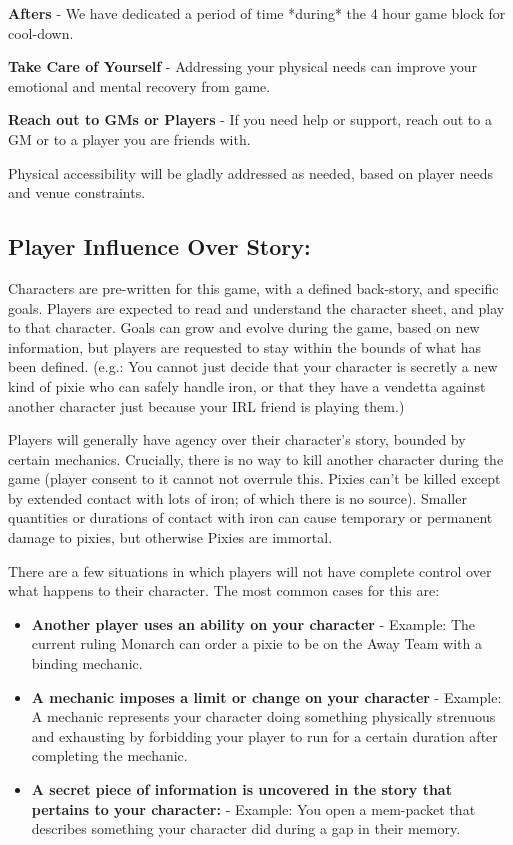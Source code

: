 \documentclass[sheet]{PP}
\begin{document}
\begin{itemz}
	\item \textbf{Afters} - We have dedicated a period of time *during* the 4 hour game block for cool-down.
	\item \textbf{Take Care of Yourself} - Addressing your physical needs can improve your emotional and mental recovery from game.
	\item \textbf{Reach out to GMs or Players} - If you need help or support, reach out to a GM or to a player you are friends with.
\end{itemz}

Physical accessibility will be gladly addressed as needed, based on player needs and venue constraints.

\subsection*{Player Influence Over Story:}
Characters are pre-written for this game, with a defined back-story, and specific goals. Players are expected to read and understand the character sheet, and play to that character. Goals can grow and evolve during the game, based on new information, but players are requested to stay within the bounds of what has been defined. (e.g.: You cannot just decide that your character is secretly a new kind of pixie who can safely handle iron, or that they have a vendetta against another character just because your IRL friend is playing them.)

Players will generally have agency over their character’s story, bounded by certain mechanics. Crucially, there is no way to kill another character during the game (player consent to it cannot not overrule this. Pixies can’t be killed except by extended contact with lots of iron; of which there is no source). Smaller quantities or durations of contact with iron can cause temporary or permanent damage to pixies, but otherwise Pixies are immortal.

There are a few situations in which players will not have complete control over what happens to their character. The most common cases for this are:
\begin{itemize}
	\item \textbf{Another player uses an ability on your character} - Example: The current ruling Monarch can order a pixie to be on the Away Team with a binding mechanic. 
	\item \textbf{A mechanic imposes a limit or change on your character} - Example:  A mechanic represents your character doing something physically strenuous and exhausting by forbidding your player to run for a certain duration after completing the mechanic.
	\item \textbf{A secret piece of information is uncovered in the story that pertains to your character:} - Example: You open a mem-packet that describes something your character did during a gap in their memory.
\end{itemize}	
\end{document}
